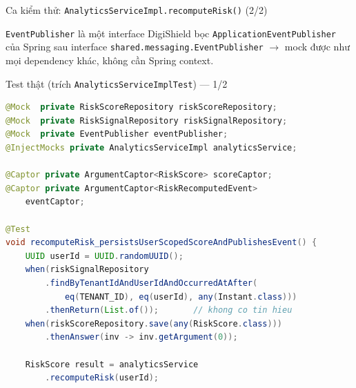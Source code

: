 \documentclass[aspectratio=169,12pt]{beamer}
\begin{document}
\begin{frame}{Ca kiểm thử: \texttt{AnalyticsServiceImpl.recomputeRisk()} (2/2)}
  \begin{block}{\texttt{EventPublisher} là một interface}
    DigiShield bọc \texttt{ApplicationEventPublisher} của Spring sau interface
    \texttt{shared.messaging.EventPublisher} $\to$ mock được như mọi
    dependency khác, không cần Spring context.
  \end{block}
\end{frame}

\begin{frame}[fragile]{Test thật (trích \texttt{AnalyticsServiceImplTest}) --- 1/2}
  \vspace*{-0.3em}
\begin{lstlisting}[language=java,basicstyle=\ttfamily\scriptsize]
@Mock  private RiskScoreRepository riskScoreRepository;
@Mock  private RiskSignalRepository riskSignalRepository;
@Mock  private EventPublisher eventPublisher;
@InjectMocks private AnalyticsServiceImpl analyticsService;

@Captor private ArgumentCaptor<RiskScore> scoreCaptor;
@Captor private ArgumentCaptor<RiskRecomputedEvent>
    eventCaptor;

@Test
void recomputeRisk_persistsUserScopedScoreAndPublishesEvent() {
    UUID userId = UUID.randomUUID();
    when(riskSignalRepository
        .findByTenantIdAndUserIdAndOccurredAtAfter(
            eq(TENANT_ID), eq(userId), any(Instant.class)))
        .thenReturn(List.of());       // khong co tin hieu
    when(riskScoreRepository.save(any(RiskScore.class)))
        .thenAnswer(inv -> inv.getArgument(0));

    RiskScore result = analyticsService
        .recomputeRisk(userId);
\end{lstlisting}
\end{frame}
\end{document}
